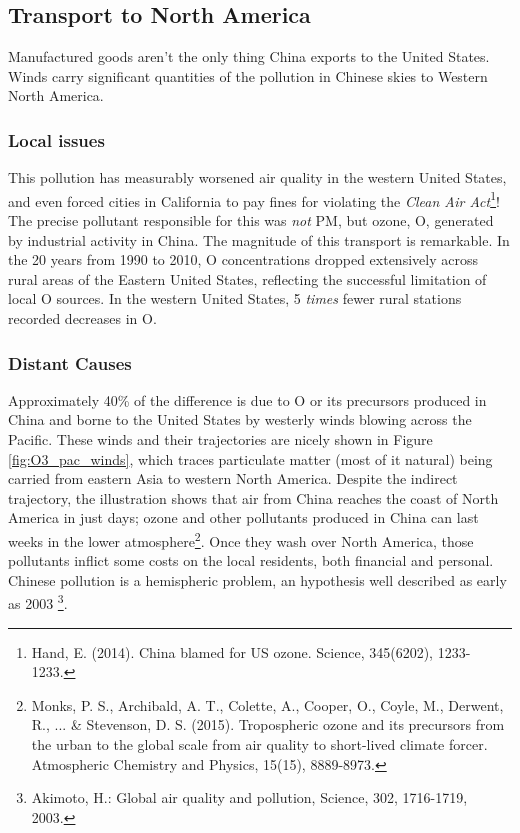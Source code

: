 \subsection{Transport to North America}
Manufactured goods aren't the only thing China exports to the United States. Winds carry significant quantities of the pollution in Chinese skies to Western North America.

\subsubsection{Local issues}
This pollution has measurably worsened air quality in the western United States, and even forced cities in California to pay fines for violating the \emph{Clean Air Act}\footnote{Hand, E. (2014). China blamed for US ozone. Science, 345(6202), 1233-1233.}! The precise pollutant responsible for this was \emph{not} PM, but ozone, O, generated by industrial activity in China. The magnitude of this transport is remarkable. In the 20 years from 1990 to 2010, O concentrations dropped extensively across rural areas of the Eastern United States, reflecting the successful limitation of local O sources. In the western United States, 5 \emph{times} fewer rural stations recorded decreases in O.

\subsubsection{Distant Causes}
Approximately 40\% of the difference is due to O or its precursors produced in China and borne to the United States by westerly winds blowing across the Pacific. These winds and their trajectories are nicely shown in Figure \ref{fig:O3_pac_winds}, which traces particulate matter (most of it natural) being carried from eastern Asia to western North America. Despite the indirect trajectory, the illustration shows that air from China reaches the coast of North America in just days; ozone and other pollutants produced in China can last weeks in the lower atmosphere\footnote{Monks, P. S., Archibald, A. T., Colette, A., Cooper, O., Coyle, M., Derwent, R., ... \& Stevenson, D. S. (2015). Tropospheric ozone and its precursors from the urban to the global scale from air quality to short-lived climate forcer. Atmospheric Chemistry and Physics, 15(15), 8889-8973.}. Once they wash over North America, those pollutants inflict some costs on the local residents, both financial and personal. Chinese pollution is a hemispheric problem, an hypothesis well described as early as 2003 \footnote{Akimoto, H.: Global air quality and pollution, Science, 302, 1716-1719, 2003.}.  


